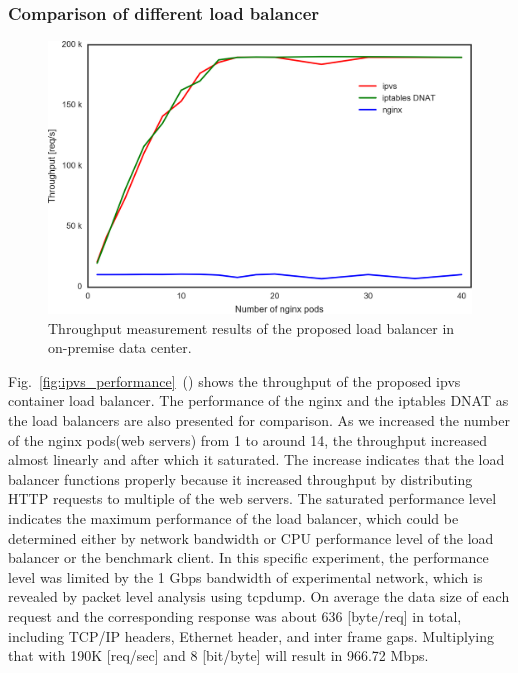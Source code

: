 \FloatBarrier

\subsubsection{Comparison of different load balancer}

\begin{figure}[h]
  \includegraphics[width=0.9\columnwidth]{Figs/ipvs-iptables-nginx}
  \caption{Throughput measurement results of the proposed load balancer in on-premise data center.}
  \label{fig:ipvs-iptables-nginx}
\end{figure}


Fig.~\ref{fig:ipvs_performance}~() shows the throughput of the proposed ipvs container load balancer.
The performance of the nginx and the iptables DNAT as the load balancers are also presented for comparison.
As we increased the number of the nginx pods(web servers) from 1 to around 14, the throughput increased almost linearly and after which it saturated.
The increase indicates that the load balancer functions properly because it increased throughput by distributing HTTP requests to multiple of the web servers.
The saturated performance level indicates the maximum performance of the load balancer, which could be determined either by network bandwidth or CPU performance level of the load balancer or the benchmark client.
In this specific experiment, the performance level was limited by the 1 Gbps bandwidth of experimental network\cite{takahashi2018portable}, which is revealed by packet level analysis using tcpdump.
On average the data size of each request and the corresponding response was about 636 [byte/req] in total, including TCP/IP headers, Ethernet header, and inter frame gaps.
Multiplying that with 190K [req/sec] and 8 [bit/byte] will result in 966.72 Mbps.

